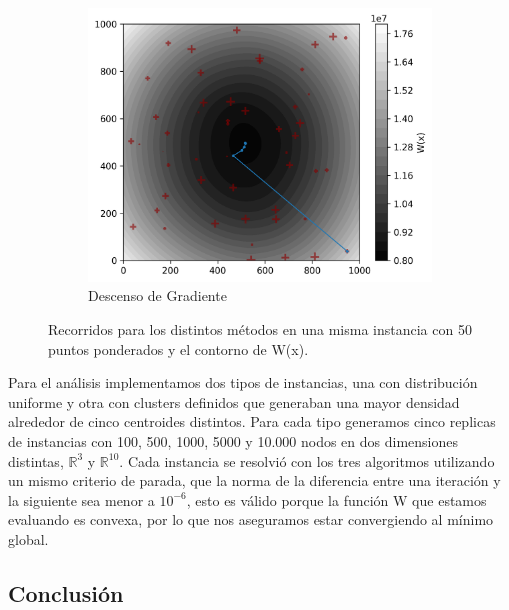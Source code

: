 \documentclass[10pt]{article}
\begin{document}
\begin{figure}[htbp]
	\begin{subfigure}[t]{0.4\textwidth}
		\centering
		\includegraphics[width=\linewidth]{figuras/recorrido_dg_8.png}
		\caption{Descenso de Gradiente}
	\end{subfigure}
	\caption{Recorridos para los distintos métodos en una misma instancia con 50 puntos ponderados y el contorno de W(x).}
	\label{fig:recorridos_instancia_8}
\end{figure}


Para el análisis implementamos dos tipos de instancias, una con distribución uniforme y otra con clusters definidos que generaban una mayor densidad alrededor de cinco centroides distintos. Para cada tipo generamos cinco replicas de instancias con 100, 500, 1000, 5000 y 10.000 nodos en dos dimensiones distintas, $\mathbb{R}^3$ y $\mathbb{R}^{10}$. Cada instancia se resolvió con los tres algoritmos utilizando un mismo criterio de parada, que la norma de la diferencia entre una iteración y la siguiente sea menor a $10^{-6}$, esto es válido porque la función W que estamos evaluando es convexa, por lo que nos aseguramos estar convergiendo al mínimo global.





\subsection{Conclusión}
\end{document}
